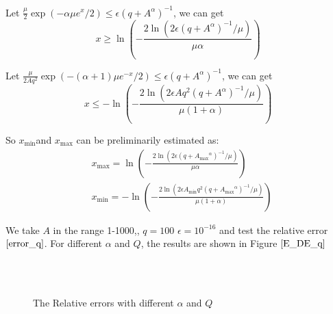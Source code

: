 Let $\frac{\mu}{2}\exp \left(  -\alpha \mu e^x /2\right) \leq \epsilon  (q+{A}^{\alpha})^{-1}$, we can get
\begin{equation}
	x\geq \ln\left(-\frac{2\ln(2\epsilon  (q+{A}^{\alpha})^{-1}/\mu)}{\mu \alpha}\right)
\end{equation}

Let $\frac{\mu}{2 Aq^2}  \exp \left(-(\alpha+1)\mu e^{-x}/2\right) \leq \epsilon  (q+{A}^{\alpha})^{-1}$, we can get
\begin{equation}
	x\leq -\ln\left(-\frac{2\ln(2\epsilon A q^2  (q+{A}^{\alpha})^{-1}/\mu)}{\mu(1+\alpha)}\right)
\end{equation}

So  $x_{\min}$and $x_{\max}$ can be preliminarily estimated as:
\begin{equation}
	\begin{aligned}
		&x_{\max}=\ln\left(-\frac{2\ln(2\epsilon  (q+{A_{\max}}^{\alpha})^{-1}/\mu)}{\mu \alpha}\right)\\
		&x_{\min}=-\ln\left(-\frac{2\ln(2\epsilon A_{\min} q^2  (q+{A_{\max}}^{\alpha})^{-1}/\mu)}{\mu(1+\alpha)}\right)
	\end{aligned}
\label{findminmax_DE_q}
\end{equation}

We take $A$ in the range 1-1000,, $q=100$  $\epsilon=10^{-16}$ and test the relative error $\eqref{error_q}$. For different $\alpha $ and $Q$, the results are shown in Figure $\ref{E_DE_q}$
\begin{figure}[htbp]
	\centering
	~~
	~~
	~~
	\\
	~~
		~~
		~~
	\caption{The Relative errors with different $\alpha$ and $Q$}
	\label{E_DE_q}
\end{figure}

